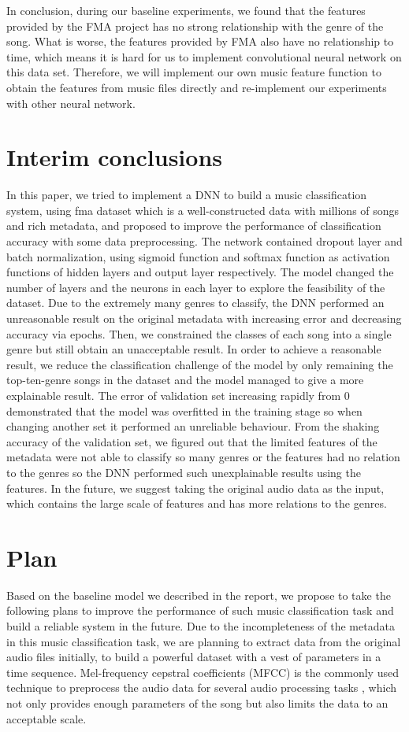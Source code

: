 \documentclass{article}
\begin{document}
In conclusion, during our baseline experiments, we found that the features provided by the FMA project has no strong relationship with the genre of the song. What is worse, the features provided by FMA also have no relationship to time, which means it is hard for us to implement convolutional neural network on this data set. Therefore, we will implement our own music feature function to obtain the features from music files directly and re-implement our experiments with other neural network.


\section{Interim conclusions}
In this paper, we tried to implement a DNN to build a music classification system, using fma dataset which is a well-constructed data with millions of songs and rich metadata, and proposed to improve the performance of classification accuracy with some data preprocessing. The network contained dropout layer and batch normalization, using sigmoid function and softmax function as activation functions of hidden layers and output layer respectively. The model changed the number of layers and the neurons in each layer to explore the feasibility of the dataset. Due to the extremely many genres to classify, the DNN performed an unreasonable result on the original metadata with increasing error and decreasing accuracy via epochs. Then, we constrained the classes of each song into a single genre but still obtain an unacceptable result. 
In order to achieve a reasonable result, we reduce the classification challenge of the model by only remaining the top-ten-genre songs in the dataset and the model managed to give a more explainable result. The error of validation set increasing rapidly from 0 demonstrated that the model was overfitted in the training stage so when changing another set it performed an unreliable behaviour. From the shaking accuracy of the validation set, we figured out that the limited features of the metadata were not able to classify so many genres or the features had no relation to the genres so the DNN performed such unexplainable results using the features. In the future, we suggest taking the original audio data as the input, which contains the large scale of features and has more relations to the genres.

\section{Plan}
Based on the baseline model we described in the report, we propose to take the following plans to improve the performance of such music classification task and build a reliable system in the future. Due to the incompleteness of the metadata in this music classification task, we are planning to extract data from the original audio files initially, to build a powerful dataset with a vest of parameters in a time sequence. Mel-frequency cepstral coefficients (MFCC) is the commonly used technique to preprocess the audio data for several audio processing tasks \cite{rabiner1993fundamentals}, which not only provides enough parameters of the song but also limits the data to an acceptable scale. 
\end{document}
